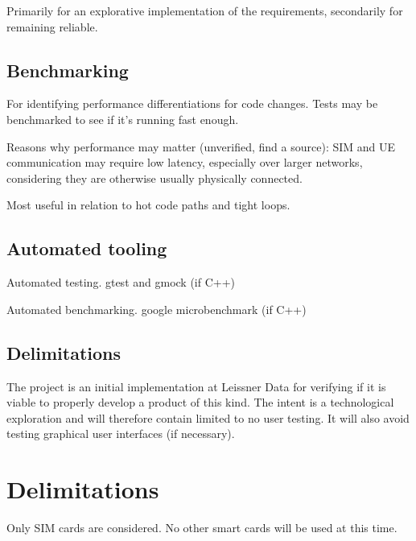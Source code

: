 Primarily for an explorative implementation of the requirements,
secondarily for remaining reliable.

\subsection{Benchmarking}

For identifying performance differentiations for code changes.
Tests may be benchmarked to see if it's running fast enough.

Reasons why performance may matter (unverified, find a source):
SIM and UE communication may require low latency, especially over
larger networks, considering they are otherwise usually
physically connected.

Most useful in relation to hot code paths and tight loops.

\subsection{Automated tooling}

Automated testing.
gtest and gmock (if C++)

Automated benchmarking.
google microbenchmark (if C++)

\subsection{Delimitations}

The project is an initial implementation at Leissner Data for
verifying if it is viable to properly develop a product of this
kind. The intent is a technological exploration and will
therefore contain limited to no user testing. It will also avoid
testing graphical user interfaces (if necessary).

\section{Delimitations}

Only SIM cards are considered. No other smart cards will be used
at this time.
